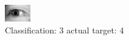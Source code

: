 \begin{figure}[h!]
\begin{center}
\includegraphics[width=0.60\columnwidth]{figures/ID3159_class_3_target_4.png}
\end{center}
\caption{ Classification: 3 actual target: 4}
\label{fig:ID3159_class_3_target_4}
\end{figure}
